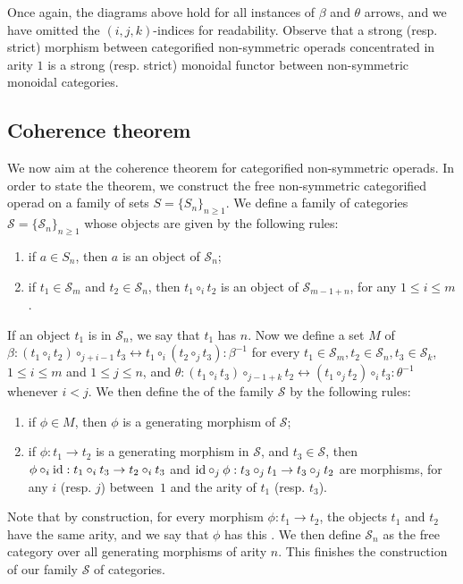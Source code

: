 Once again, the diagrams above hold for all instances of $\beta$ and $\theta$ arrows, and we have omitted the $(i,j,k)$-indices for readability. 
Observe that a strong (resp. strict) morphism between categorified non-symmetric operads concentrated in arity $1$ is a strong (resp. strict) monoidal functor between non-symmetric monoidal categories. 


\subsection{Coherence theorem}
\label{ss:coherence-catoperads}

We now aim at the coherence theorem for categorified non-symmetric operads.
In order to state the theorem, we construct the free non-symmetric categorified operad on a family of sets $S=\{S_n\}_{n \geq 1}$.
We define a family of categories~$\mathcal{S}=\{\mathcal{S}_n\}_{n \geq 1}$ whose objects are given by the following rules:
\begin{enumerate}
    \item if $a \in S_n$, then $a$ is an object of $\mathcal{S}_n$;
    \item if $t_1 \in \mathcal{S}_m$ and $t_2 \in \mathcal{S}_n$, then $t_1 \circ_i t_2$ is an object of $\mathcal{S}_{m-1+n}$, for any $1 \leq i \leq m$.
\end{enumerate}
If an object $t_1$ is in $\mathcal{S}_n$, we say that $t_1$ has  $n$. 
Now we define a set $M$ of  $\beta: (t_1 \circ_i t_2) \circ_{j+i-1} t_3 \leftrightarrow t_1 \circ_i (t_2 \circ_j t_3) : \beta^{-1}$ for every $t_1 \in \mathcal{S}_m, t_2 \in \mathcal{S}_n, t_3 \in \mathcal{S}_k$, $1 \leq i \leq m$ and $1 \leq j \leq n$, and $\theta: (t_1 \circ_i t_3) \circ_{j-1+k} t_2 \leftrightarrow (t_1 \circ_j t_2) \circ_i t_3 : \theta^{-1}$ whenever $i<j$.
We then define the  of the family $\mathcal{S}$ by the following rules:
\begin{enumerate}
    \item if $\phi \in M$, then $\phi$ is a generating morphism of $\mathcal{S}$; 
    \item if $\phi : t_1 \to t_2$ is a generating morphism in $\mathcal{S}$, and $t_3 \in \mathcal{S}$, then $\phi \circ_i \mathrm{id} : t_1 \circ_i t_3 \to t_2 \circ_i t_3$ and $\mathrm{id} \circ_j \phi : t_3 \circ_j t_1 \to t_3 \circ_j t_2$ are  morphisms, for any $i$ (resp. $j$) between~$1$ and the arity of $t_1$ (resp. $t_3$).
\end{enumerate}
Note that by construction, for every morphism $\phi : t_1 \to t_2$, the objects $t_1$ and $t_2$ have the same arity, and we say that $\phi$ has this . 
We then define $\mathcal{S}_n$ as the free category over all generating morphisms of arity $n$. 
This finishes the construction of our family $\mathcal{S}$ of categories.

